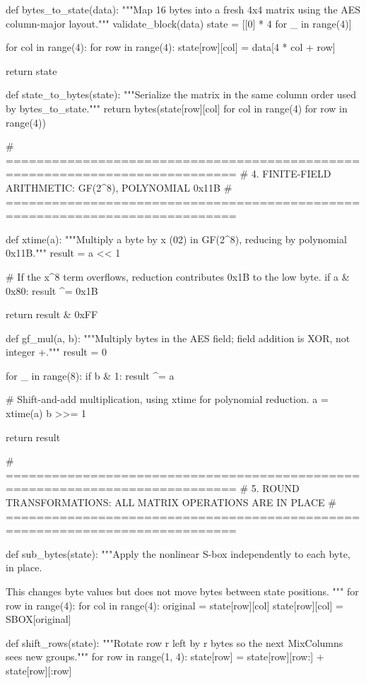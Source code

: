 \begin{lightcode}[numbers=left,firstnumber=1]
def bytes_to_state(data):
    """Map 16 bytes into a fresh 4x4 matrix using the AES column-major layout."""
    validate_block(data)
    state = [[0] * 4 for _ in range(4)]

    for col in range(4):
        for row in range(4):
            state[row][col] = data[4 * col + row]

    return state


def state_to_bytes(state):
    """Serialize the matrix in the same column order used by bytes_to_state."""
    return bytes(state[row][col] for col in range(4) for row in range(4))


# ============================================================================
# 4. FINITE-FIELD ARITHMETIC: GF(2^8), POLYNOMIAL 0x11B
# ============================================================================


def xtime(a):
    """Multiply a byte by x (02) in GF(2^8), reducing by polynomial 0x11B."""
    result = a << 1

    # If the x^8 term overflows, reduction contributes 0x1B to the low byte.
    if a & 0x80:
        result ^= 0x1B

    return result & 0xFF


def gf_mul(a, b):
    """Multiply bytes in the AES field; field addition is XOR, not integer +."""
    result = 0

    for _ in range(8):
        if b & 1:
            result ^= a

        # Shift-and-add multiplication, using xtime for polynomial reduction.
        a = xtime(a)
        b >>= 1

    return result


# ============================================================================
# 5. ROUND TRANSFORMATIONS: ALL MATRIX OPERATIONS ARE IN PLACE
# ============================================================================


def sub_bytes(state):
    """Apply the nonlinear S-box independently to each byte, in place.

    This changes byte values but does not move bytes between state positions.
    """
    for row in range(4):
        for col in range(4):
            original = state[row][col]
            state[row][col] = SBOX[original]


def shift_rows(state):
    """Rotate row r left by r bytes so the next MixColumns sees new groups."""
    for row in range(1, 4):
        state[row] = state[row][row:] + state[row][:row]



\end{lightcode}
